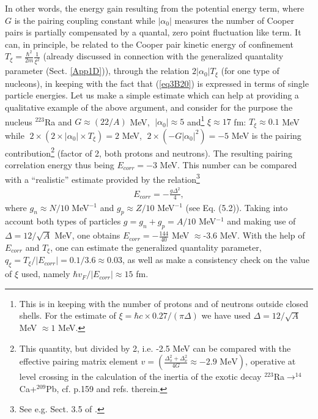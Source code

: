  
 In other words, the energy gain resulting from the potential energy term, where $G$ is the pairing coupling constant while $|\alpha_0|$ measures the number of Cooper pairs is partially compensated by a quantal, zero point fluctuation like term. It can, in principle, be related to the Cooper pair kinetic energy of confinement $T_\xi=\frac{\hbar^2}{2m}\frac{1}{\xi^2}$ (already discussed in connection with the generalized quantality parameter (Sect. \ref{App1D})), through the relation $2|\alpha_0|T_\xi$ (for one type of nucleons), in keeping with the fact that (\ref{eq3B20}) is expressed in terms of single particle energies. Let us make a simple estimate which can help at providing a qualitative example of the above argument, and consider for the purpose the nucleus $^{223}$Ra and $G\approx(22/A)$ MeV,      $\;|\alpha_0|\approx 5$ and\footnote{This is in keeping with the number of protons and of neutrons outside closed shells. For the estimate of $\xi=\hbar c\times0.27/(\pi\Delta)$ we have used $\Delta=12/\sqrt{A}$ MeV $\approx1$ MeV.} $\xi\approx 17$ fm: $T_\xi\approx 0.1$ MeV while $\;2\times(2\times|\alpha_0|\times T_\xi)=2$ MeV, $\;2\times (-G|\alpha_0|^2)=-5$ MeV is the pairing contribution\footnote{This quantity, but divided by 2, i.e. -2.5 MeV can be compared with the effective pairing matrix element $v=\left(\frac{\Delta_\pi^2+\Delta_\nu^2}{4G}\approx -2.9 \text{ MeV}\right)$, operative at level crossing in the calculation of the inertia of the exotic decay $^{223}$Ra$\rightarrow^{14}$Ca+$^{209}$Pb, cf. \cite{Brink:05} p.159 and refs. therein.} (factor of 2, both protons and neutrons). The resulting pairing correlation energy thus being $E_{corr}=-3$ MeV. This number can be compared with a ``realistic'' estimate provided by the relation\footnote{See e.g. Sect. 3.5 of \cite{Brink:05}.}
   \begin{align}\label{eq3B21}
E_{corr}=-\frac{g\Delta^2}{4},
   \end{align}  
 where $g_n\approx N/10$ MeV$^{-1}$ and $g_p\approx Z/10$ MeV$^{-1}$ (see \cite{Bortignon:98} Eq. (5.2)). Taking into account both types of particles $g=g_n+g_p=A/10$ MeV$^{-1}$ and making use of $\Delta=12/\sqrt{A}$ MeV, one obtains $E_{corr}=-\frac{144}{40}$ MeV $\approx$-3.6 MeV. With the help of $E_{corr}$ and $T_\xi$, one can estimate the generalized quantality parameter, $q_\xi=T_\xi/|E_{corr}|=0.1/3.6\approx 0.03$, as well as make a consistency check  on the value of $\xi$ used, namely $\hbar v_F/|E_{corr}|\approx 15$ fm.
 
